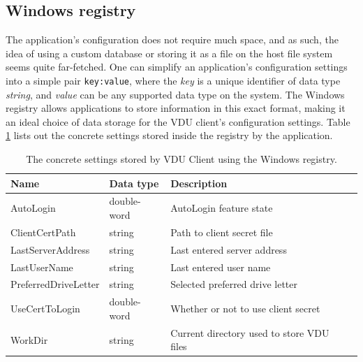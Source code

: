 \subsection{Windows registry}
The application's configuration does not require much space, and as such, the idea of using a custom database or storing it as a file on the host file system seems quite far-fetched. 
One can simplify an application's configuration settings into a simple pair \lstinline{key:value}, where the \textit{key} is a unique identifier of data type \textit{string}, and \textit{value} can be any supported data type on the system. The Windows registry allows applications to store information in this exact format, making it an ideal choice of data storage for the VDU client's configuration settings. Table \ref{vduregistrytable} lists out the concrete settings stored inside the registry by the application.
\begin{table}[hbt]
\centering
\label{vduregistrytable}
\begin{tabular}{|l|l|l|l|}
\hline
\textbf{Name} & \textbf{Data type} & \textbf{Description} \\ \hline
 AutoLogin & double-word & AutoLogin feature state \\ \hline
 ClientCertPath & string & Path to client secret file \\ \hline
 LastServerAddress & string & Last entered server address \\ \hline
 LastUserName & string & Last entered user name \\ \hline
 PreferredDriveLetter & string & Selected preferred drive letter \\ \hline
 UseCertToLogin & double-word & Whether or not to use client secret \\ \hline
 WorkDir & string & Current directory used to store VDU files  \\ \hline
\end{tabular}
\caption{The concrete settings stored by VDU Client using the Windows registry.}
\end{table} 



